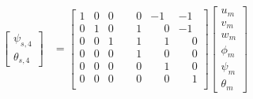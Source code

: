 \documentclass[10pt,b5paper,titlepage]{book}
\newenvironment{eqarray}
{
    \begin{eqnarray}
        \begin{aligned}
}
{
        \end{aligned}
    \end{eqnarray}
}
\begin{document}
\begin{eqarray}
\begin{bmatrix}
        \psi_{s,4} \\
        \theta_{s,4}
    \end{bmatrix}
    &= \begin{bmatrix}
        1 & 0 & 0 & \phantom{-}0 & -1 & -1 \\
        0 & 1 & 0 & \phantom{-}1 & \phantom{-}0 & -1 \\
        0 & 0 & 1 & \phantom{-}1 & \phantom{-}1 & \phantom{-}0 \\
        0 & 0 & 0 & \phantom{-}1 & \phantom{-}0 & \phantom{-}0 \\
        0 & 0 & 0 & \phantom{-}0 & \phantom{-}1 & \phantom{-}0 \\
        0 & 0 & 0 & \phantom{-}0 & \phantom{-}0 & \phantom{-}1 \\
    \end{bmatrix}
    \begin{bmatrix}
        u_m \\
        v_m \\
        w_m \\
        \phi_m \\
        \psi_m \\
        \theta_m
    \end{bmatrix}
\end{eqarray}
\renewcommand\arraystretch{1}
\end{document}
